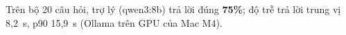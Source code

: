 Trên bộ 20 câu hỏi, trợ lý (qwen3:8b) trả lời đúng \textbf{75\%}; độ trễ trả lời trung vị 8,2~s, p90 15,9~s (Ollama trên GPU của Mac M4).